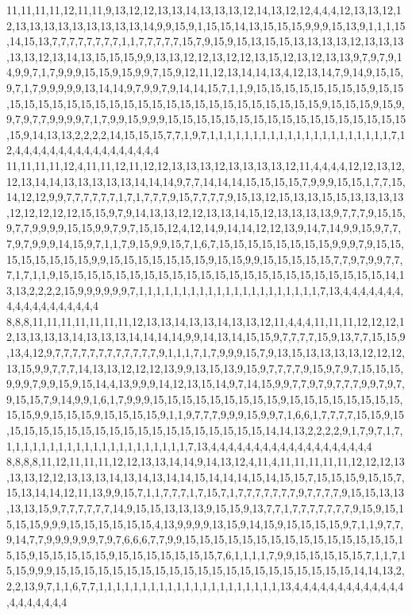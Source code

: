 11,11,11,11,12,11,11,9,13,12,12,13,13,14,13,13,13,12,14,13,12,12,4,4,4,12,13,13,12,12,13,13,13,13,13,13,13,13,13,14,9,9,15,9,1,15,15,14,13,15,15,15,9,9,9,15,13,9,1,1,1,15,14,15,13,7,7,7,7,7,7,7,7,1,1,7,7,7,7,7,15,7,9,15,9,15,13,15,15,13,13,13,13,12,13,13,13,13,13,12,13,14,13,15,15,15,9,9,13,13,12,12,13,12,12,13,15,12,13,12,13,13,9,7,9,7,9,14,9,9,7,1,7,9,9,9,15,15,9,15,9,9,7,15,9,12,11,12,13,14,14,13,4,12,13,14,7,9,14,9,15,15,9,7,1,7,9,9,9,9,9,13,14,14,9,7,9,9,7,9,14,14,15,7,1,1,9,15,15,15,15,15,15,15,15,9,15,15,15,15,15,15,15,15,15,15,15,15,15,15,15,15,15,15,15,15,15,15,15,15,9,15,15,15,9,15,9,9,7,9,7,7,9,9,9,9,7,1,7,9,9,15,9,9,9,15,15,15,15,15,15,15,15,15,15,15,15,15,15,15,15,15,15,9,14,13,13,2,2,2,2,14,15,15,15,7,7,1,9,7,1,1,1,1,1,1,1,1,1,1,1,1,1,1,1,1,1,1,1,1,1,7,12,4,4,4,4,4,4,4,4,4,4,4,4,4,4,4,4,4
11,11,11,11,12,4,11,11,12,11,12,12,13,13,13,12,13,13,13,13,12,11,4,4,4,4,12,12,13,12,12,13,14,14,13,13,13,13,13,14,14,14,9,7,7,14,14,14,15,15,15,15,7,9,9,9,15,15,1,7,7,15,14,12,12,9,9,7,7,7,7,7,7,1,7,1,7,7,7,9,15,7,7,7,7,9,15,13,12,15,13,13,15,15,13,13,13,13,12,12,12,12,12,15,15,9,7,9,14,13,13,12,12,13,13,14,15,12,13,13,13,13,9,7,7,7,9,15,15,9,7,7,9,9,9,9,15,15,9,9,7,9,7,15,15,12,4,12,14,9,14,14,12,12,13,9,14,7,14,9,9,15,9,7,7,7,9,7,9,9,9,14,15,9,7,1,1,7,9,15,9,9,15,7,1,6,7,15,15,15,15,15,15,15,15,9,9,9,7,9,15,15,15,15,15,15,15,15,9,9,15,15,15,15,15,15,15,9,15,15,9,9,15,15,15,15,15,7,7,9,7,9,9,7,7,7,1,7,1,1,9,15,15,15,15,15,15,15,15,15,15,15,15,15,15,15,15,15,15,15,15,15,15,15,14,13,13,2,2,2,2,15,9,9,9,9,9,9,7,1,1,1,1,1,1,1,1,1,1,1,1,1,1,1,1,1,1,1,1,1,7,13,4,4,4,4,4,4,4,4,4,4,4,4,4,4,4,4,4,4
8,8,8,11,11,11,11,11,11,11,12,13,13,14,13,13,14,13,13,12,11,4,4,4,11,11,11,12,12,12,12,13,13,13,13,14,13,13,13,14,14,14,14,9,9,14,13,14,15,15,9,7,7,7,7,15,9,13,7,7,15,15,9,13,4,12,9,7,7,7,7,7,7,7,7,7,7,7,7,9,1,1,1,7,1,7,9,9,9,15,7,9,13,15,13,13,13,13,12,12,12,13,15,9,9,7,7,7,14,13,13,12,12,12,13,9,9,13,15,13,9,15,9,7,7,7,7,9,15,9,7,9,7,15,15,15,9,9,9,7,9,9,15,9,15,14,4,13,9,9,9,14,12,13,15,14,9,7,14,15,9,9,7,7,9,7,9,7,7,7,9,9,7,9,7,9,15,15,7,9,14,9,9,1,6,1,7,9,9,9,15,15,15,15,15,15,15,15,15,9,15,15,15,15,15,15,15,15,15,15,9,9,15,15,15,9,15,15,15,15,9,1,1,9,7,7,7,9,9,9,15,9,9,7,1,6,6,1,7,7,7,7,15,15,9,15,15,15,15,15,15,15,15,15,15,15,15,15,15,15,15,15,15,15,14,14,13,2,2,2,2,9,1,7,9,7,1,7,1,1,1,1,1,1,1,1,1,1,1,1,1,1,1,1,1,1,1,1,1,7,13,4,4,4,4,4,4,4,4,4,4,4,4,4,4,4,4,4,4,4
8,8,8,8,11,12,11,11,11,12,12,13,13,14,14,9,14,13,12,4,11,4,11,11,11,11,11,12,12,12,13,13,13,12,12,13,13,13,14,13,14,13,14,14,15,14,14,14,15,14,15,15,7,15,15,15,9,15,15,7,15,13,14,14,12,11,13,9,9,15,7,1,1,7,7,7,1,7,15,7,1,7,7,7,7,7,7,7,9,7,7,7,7,9,15,15,13,13,13,13,15,9,7,7,7,7,7,7,14,9,15,15,13,13,13,9,15,15,9,13,7,7,1,7,7,7,7,7,7,7,9,15,9,15,15,15,15,9,9,9,15,15,15,15,15,15,4,13,9,9,9,9,13,15,9,14,15,9,15,15,15,15,9,7,1,1,9,7,7,9,14,7,7,9,9,9,9,9,9,7,9,7,6,6,6,7,7,9,9,15,15,15,15,15,15,15,15,15,15,15,15,15,15,15,15,15,9,15,15,15,15,15,9,15,15,15,15,15,15,15,7,6,1,1,1,1,7,9,9,15,15,15,15,15,7,1,1,7,15,15,9,9,9,15,15,15,15,15,15,15,15,15,15,15,15,15,15,15,15,15,15,15,15,15,14,14,13,2,2,2,13,9,7,1,1,6,7,7,1,1,1,1,1,1,1,1,1,1,1,1,1,1,1,1,1,1,1,1,1,13,4,4,4,4,4,4,4,4,4,4,4,4,4,4,4,4,4,4,4,4
